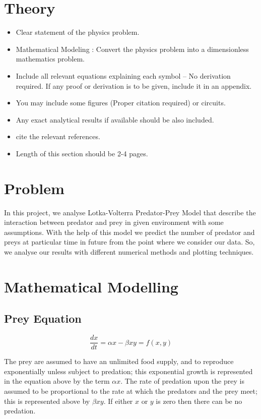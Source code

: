 \documentclass[12pt]{article}
\begin{document}
\section{Theory}
\label{sec:theory}
\begin{itemize}
    \item Clear statement of the physics problem.
    \item Mathematical Modeling : Convert the physics problem into a dimensionless mathematics problem.
    \item Include all relevant equations explaining each symbol -- No derivation required. If any proof or derivation is to be given, include it in an appendix.
    \item You may include some figures (Proper citation required) or circuits.
    \item Any exact analytical results if available should be also included.
    \item cite the relevant references.
    \item Length of this section should be 2-4 pages.
\end{itemize}
\section*{Problem}
In this project, we analyse Lotka-Volterra Predator-Prey Model that describe the interaction between predator and prey in given environment with some assumptions. With the help of this model we predict the number of predator and preys at particular time in future from the point where we consider our data. So, we analyse our results with different numerical methods and plotting techniques.
\section*{Mathematical Modelling}
\subsection*{Prey Equation}
\begin{equation*}
     \frac { d x } { d t } = \alpha x - \beta x y = f(x,y)
\end{equation*}

The prey are assumed to have an unlimited food supply, and to reproduce exponentially unless subject to predation;
this exponential growth is represented in the equation above by the term $ \alpha x . $ The rate of predation upon the prey is
assumed to be proportional to the rate at which the predators and the prey meet; this is represented above by $ \beta x y $. If
either $ x $ or $ y $ is zero then there can be no predation.
\end{document}
